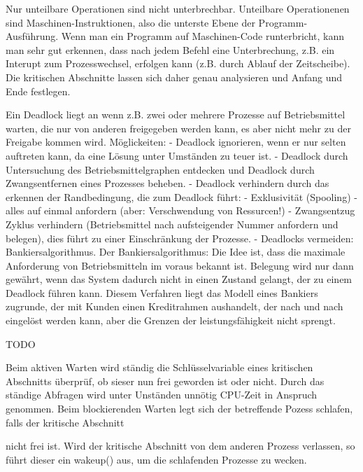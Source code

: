 \begin{answer}
Nur unteilbare Operationen sind nicht unterbrechbar.
Unteilbare Operationenen sind Maschinen-Instruktionen, also die unterste Ebene der Programm-
Ausführung. Wenn man ein Programm auf Maschinen-Code runterbricht, kann man sehr gut
erkennen, dass nach jedem Befehl eine Unterbrechung, z.B. ein Interupt zum Prozesswechsel,
erfolgen kann (z.B. durch Ablauf der Zeitscheibe). Die kritischen Abschnitte lassen sich daher
genau analysieren und Anfang und Ende festlegen.
\end{answer}

\begin{answer}
Ein Deadlock liegt an wenn z.B. zwei oder mehrere Prozesse auf Betriebsmittel warten, die nur
von anderen freigegeben werden kann, es aber nicht mehr zu der Freigabe kommen wird.
Möglickeiten:
- Deadlock ignorieren, wenn er nur selten auftreten kann, da eine Lösung unter Umständen zu
teuer ist.
- Deadlock durch Untersuchung des Betriebsmittelgraphen entdecken und Deadlock durch Zwangsentfernen
eines Prozesses beheben.
- Deadlock verhindern durch das erkennen der Randbedingung, die zum Deadlock führt:
- Exklusivität (Spooling)
- alles auf einmal anfordern (aber: Verschwendung von Ressurcen!)
- Zwangsentzug
Zyklus verhindern (Betriebsmittel nach aufsteigender Nummer anfordern und belegen), dies führt
zu einer Einschränkung der Prozesse.
- Deadlocks vermeiden: Bankiersalgorithmus.
Der Bankiersalgorithmus:
Die Idee ist, dass die maximale Anforderung von Betriebsmitteln im voraus bekannt ist. Belegung
wird nur dann gewährt, wenn das System dadurch nicht in einen Zustand gelangt, der zu einem
Deadlock führen kann. Diesem Verfahren liegt das Modell eines Bankiers zugrunde, der mit Kunden
einen Kreditrahmen aushandelt, der nach und nach eingelöst werden kann, aber die Grenzen der
leistungsfähigkeit nicht sprengt.
\end{answer}

\begin{answer}
TODO
\end{answer}

\begin{answer}
Beim aktiven Warten wird ständig die Schlüsselvariable eines kritischen Abschnitts überprüf, ob sieser nun frei geworden ist oder nicht. Durch das ständige Abfragen wird unter Unständen unnötig CPU-Zeit in Anspruch genommen.
Beim blockierenden Warten legt sich der betreffende Pozess schlafen, falls der kritische Abschnitt

nicht frei ist. Wird der kritische Abschnitt von dem anderen Prozess verlassen, so führt dieser ein
wakeup() aus, um die schlafenden Prozesse zu wecken.
\end{answer}

